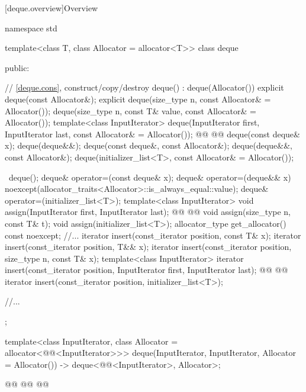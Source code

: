 \documentclass{wg21}
\begin{document}
[deque.overview]{Overview}
\begin{codeblock}
namespace std {
    template<class T, class Allocator = allocator<T>>
    class deque {
        public:

        // \ref{deque.cons}, construct/copy/destroy
        deque() : deque(Allocator()) { }
        explicit deque(const Allocator&);
        explicit deque(size_type n, const Allocator& = Allocator());
        deque(size_type n, const T& value, const Allocator& = Allocator());
        template<class InputIterator>
        deque(InputIterator first, InputIterator last, const Allocator& = Allocator());
        @@
        @@
        deque(const deque& x);
        deque(deque&&);
        deque(const deque&, const Allocator&);
        deque(deque&&, const Allocator&);
        deque(initializer_list<T>, const Allocator& = Allocator());

        ~deque();
        deque& operator=(const deque& x);
        deque& operator=(deque&& x)
        noexcept(allocator_traits<Allocator>::is_always_equal::value);
        deque& operator=(initializer_list<T>);
        template<class InputIterator>
        void assign(InputIterator first, InputIterator last);
        @@
        @@
        void assign(size_type n, const T& t);
        void assign(initializer_list<T>);
        allocator_type get_allocator() const noexcept;
        //...
        iterator insert(const_iterator position, const T& x);
        iterator insert(const_iterator position, T&& x);
        iterator insert(const_iterator position, size_type n, const T& x);
        template<class InputIterator>
        iterator insert(const_iterator position, InputIterator first, InputIterator last);
        @@
        @@
        iterator insert(const_iterator position, initializer_list<T>);

        //...
    };

    template<class InputIterator, class Allocator = allocator<@@<InputIterator>>>
    deque(InputIterator, InputIterator, Allocator = Allocator())
    -> deque<@@<InputIterator>, Allocator>;

    @@
    @@
    @@
}
\end{codeblock}
\end{document}
